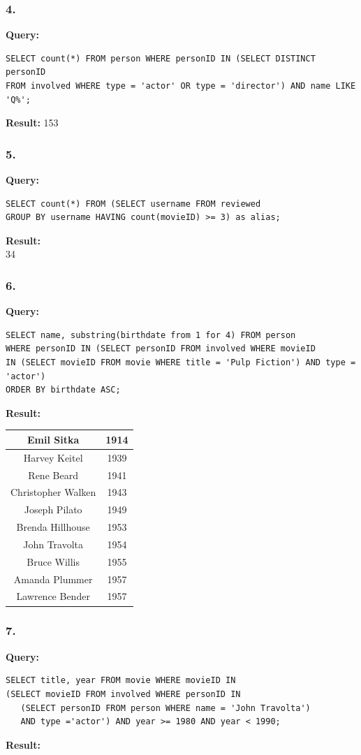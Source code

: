 \documentclass[10pt,a4paper,final]{report}
\begin{document}
\subsubsection*{4.}
\textbf{Query:}
\begin{lstlisting}
SELECT count(*) FROM person WHERE personID IN (SELECT DISTINCT personID 
FROM involved WHERE type = 'actor' OR type = 'director') AND name LIKE 'Q%';
\end{lstlisting}
\textbf{Result:}
153

\subsubsection*{5.}
\textbf{Query:}
\begin{lstlisting}
SELECT count(*) FROM (SELECT username FROM reviewed 
GROUP BY username HAVING count(movieID) >= 3) as alias;
\end{lstlisting}
\textbf{Result:}\\
34
\subsubsection*{6.}
\textbf{Query:}
\begin{lstlisting}
SELECT name, substring(birthdate from 1 for 4) FROM person 
WHERE personID IN (SELECT personID FROM involved WHERE movieID 
IN (SELECT movieID FROM movie WHERE title = 'Pulp Fiction') AND type = 'actor') 
ORDER BY birthdate ASC;
\end{lstlisting}
\textbf{Result:}

\begin{tabular}{|c|c|}
\hline 
Emil Sitka & 1914 \\ 
\hline 
Harvey Keitel & 1939 \\ 
\hline 
Rene Beard & 1941 \\ 
\hline 
Christopher Walken & 1943 \\ 
\hline 
Joseph Pilato & 1949 \\ 
\hline 
Brenda Hillhouse & 1953 \\ 
\hline 
John Travolta & 1954 \\ 
\hline 
Bruce Willis & 1955 \\ 
\hline 
Amanda Plummer & 1957 \\ 
\hline 
Lawrence Bender & 1957 \\ 
\hline 
\end{tabular} 

\subsubsection*{7.}
\textbf{Query:}
\begin{lstlisting}
SELECT title, year FROM movie WHERE movieID IN 
(SELECT movieID FROM involved WHERE personID IN 
   (SELECT personID FROM person WHERE name = 'John Travolta') 
   AND type ='actor') AND year >= 1980 AND year < 1990;
\end{lstlisting}
\textbf{Result:}
\end{document}
